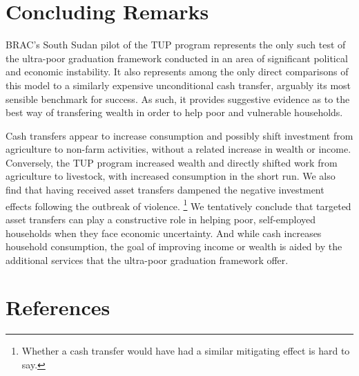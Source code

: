 \documentclass[12pt,article]{article}
\begin{document}
\newpage
\section{Concluding Remarks}
\label{sec-4}

BRAC's South Sudan pilot of the TUP program represents the only such test of the
ultra-poor graduation framework conducted in an area of significant political and
economic instability. It also represents among the only direct comparisons of this
model to a similarly expensive unconditional cash transfer, arguably its most
sensible benchmark for success. As such, it provides suggestive evidence as to the
best way of transfering wealth in order to help poor and vulnerable households.

Cash transfers appear to increase consumption and possibly shift investment from
agriculture to non-farm activities, without a related increase in wealth or income.
Conversely, the TUP program increased wealth and directly shifted work from
agriculture to livestock, with increased consumption in the short run. We also find
that having received asset transfers dampened the negative investment effects
following the outbreak of violence. \footnote{Whether a cash transfer would have had a
similar mitigating effect is hard to say.} We tentatively conclude that targeted
asset transfers can play a constructive role in helping poor, self-employed
households when they face economic uncertainty. And while cash increases household
consumption, the goal of improving income or wealth is aided by the additional
services that the ultra-poor graduation framework offer.


\section{References}
\label{sec-5}
\renewcommand{\refname}{}
\printbibliography
\end{document}
